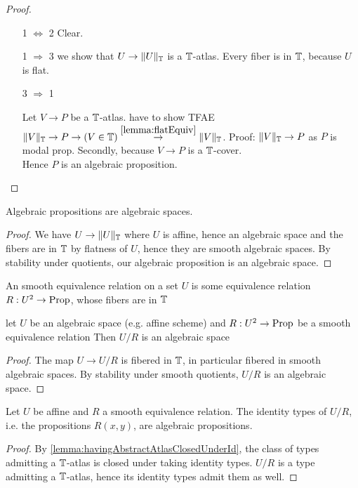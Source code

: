 \begin{proof} \
	\begin{enumerate}
		\item [1 $\Leftrightarrow$ 2]
		Clear.
		\item [1 $\Rightarrow$ 3]
			we show that $U \to \|U\|_{\mathbb{T}}$ is a $\mathbb{T}$-atlas. Every fiber is in $\mathbb{T}$, because $U$ is flat.
		\item [3 $\Rightarrow$ 1]
		
				Let $V \to P$ be a $\mathbb{T}$-atlas.
		have to show TFAE $\|V\|_{\mathbb{T}} \to P \to (V \in \mathbb{T}) \overset{\ref{lemma:flatEquiv}}{\to} \|V\|_{\mathbb{T}}$. 
		Proof: $\|V\|_{\mathbb{T}} \to P$ as $P$ is modal prop. Secondly, because $V \to P$ is a $\mathbb{T}$-cover. \\
		Hence $P$ is an algebraic proposition.	
	\end{enumerate}

\end{proof}

\begin{lemma}
	Algebraic propositions are algebraic spaces.
\end{lemma}
\begin{proof}
	We have $U \to \|U\|_{\mathbb{T}}$ where $U$ is affine, hence an algebraic space and the fibers are in $\mathbb{T}$ by flatness of $U$, hence they are smooth algebraic spaces. By stability under quotients, our algebraic proposition is an algebraic space.
\end{proof}

\begin{definition}
	An smooth equivalence relation on a set $U$ is some equivalence relation $R : U^2 \to \operatorname{Prop}$, whose fibers are in $\mathbb{T}$
\end{definition}
\begin{lemma}
	let $U$ be an algebraic space (e.g. affine scheme) and $R : U^2 \to \operatorname{Prop}$ be a smooth equivalence relation %
	Then $U / R$ is an algebraic space
\end{lemma}
\begin{proof}
	The map $U \to U / R$ is fibered in $\mathbb{T}$, in particular fibered in smooth algebraic spaces.%
	By stability under smooth quotients, $U / R$ is an algebraic space.
\end{proof}



\begin{corollary}
	Let $U$ be affine and $R$ a smooth equivalence relation. The identity types of $U / R$, i.e. the propositions $R(x,y)$, are algebraic propositions. %
\end{corollary}
\begin{proof}
	By \ref{lemma:havingAbstractAtlasClosedUnderId}, the class of types admitting a $\mathbb{T}$-atlas is closed under taking identity types. 	$U / R$ is a type admitting a $\mathbb{T}$-atlas, hence its identity types admit them as well.
\end{proof}

